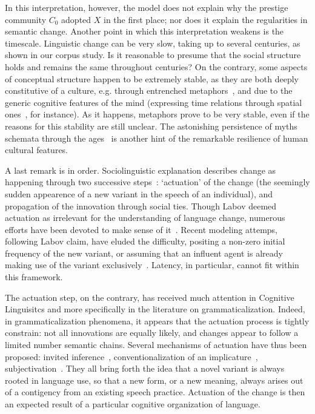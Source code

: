 \documentclass[12pt,twocolumn,amsmath,amssymb,aps,longbibliography]{revtex4-1}  %
\begin{document}
In this interpretation, however, the model does not explain why the prestige community $C_0$ adopted $X$ in the first place; nor does it explain the regularities in semantic change. Another point in which this interpretation weakens is the timescale. Linguistic change can be very slow, taking up to several centuries, as shown in our corpus study. Is it reasonable to presume that the social structure holds and remains the same throughout centuries? On the contrary, some aspects of conceptual structure happen to be extremely stable, as they are both deeply constitutive of a culture, e.g. through entrenched metaphors~\cite{lakoff2008metaphors}, and due to the generic cognitive features of the mind (expressing time relations through spatial ones~\cite{heine1997cognitive}, for instance). As it happens, metaphors prove to be very stable, even if the reasons for this stability are still unclear. The astonishing persistence of myths schemata through the ages~\cite{da2016comparative} is another hint of the remarkable resilience of human cultural features. 

A last remark is in order. Sociolinguistic explanation describes change as happening through two successive steps~\cite{weinreich1968empirical}: `actuation' of the change (the seemingly sudden appearence of a new variant in the speech of an individual), and propagation of the innovation through social ties. Though Labov deemed actuation as irrelevant for the understanding of language change, numerous efforts have been devoted to make sense of it~\cite{mcmahon1994understanding,nettle1999using}. Recent modeling attemps, following Labov claim, have eluded the difficulty, positing a non-zero initial frequency of the new variant, or assuming that an influent agent is already making use of the variant exclusively~\cite{ke2008language,blythe2012s}. Latency, in particular, cannot fit within this framework. 

The actuation step, on the contrary, has received much attention in Cognitive Linguisitcs and more specifically in the literature on grammaticalization. Indeed, in grammaticalization phenomena, it appears that the actuation process is tightly constrain: not all innovations are equally likely, and changes appear to follow a limited number semantic chains. Several mechanisms of actuation have thus been proposed: invited inference~\cite{traugott1989rise}, conventionalization of an implicature~\cite{nicolle1998relevance}, subjectivation~\cite{marchello2006grammaticalisation}. They all bring forth the idea that a novel variant is always rooted in language use, so that a new form, or a new meaning, always arises out of a contigency from an existing speech practice. Actuation of the change is then an expected result of a particular cognitive organization of language. 
\end{document}
